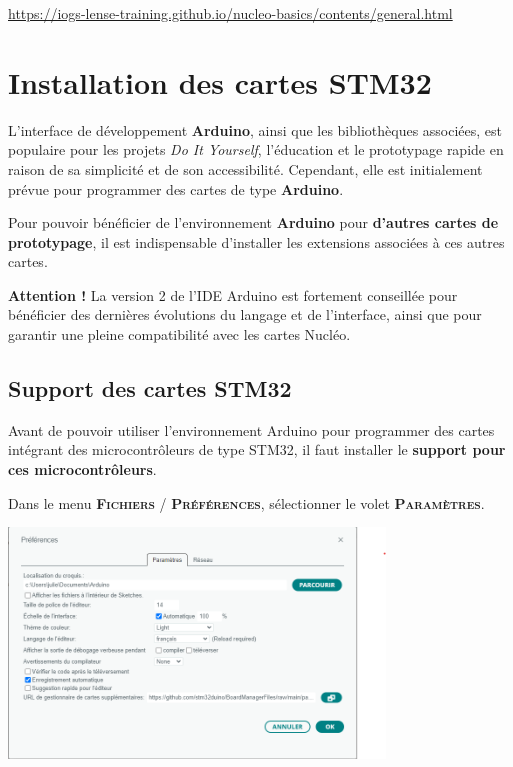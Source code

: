 \documentclass[a4paper,11pt,titlepage]{article} %
\begin{document}
\href{https://iogs-lense-training.github.io/nucleo-basics/contents/general.html}{https://iogs-lense-training.github.io/nucleo-basics/contents/general.html}

\cleardoublepage
\section{Installation des cartes STM32}

L'interface de développement \textbf{Arduino}, ainsi que les bibliothèques associées, est populaire pour les projets \textit{Do It Yourself}, l'éducation et le prototypage rapide en raison de sa simplicité et de son accessibilité. Cependant, elle est initialement prévue pour programmer des cartes de type \textbf{Arduino}.

Pour pouvoir bénéficier de l'environnement \textbf{Arduino} pour \textbf{d'autres cartes de prototypage}, il est indispensable d'installer les extensions associées à ces autres cartes.

\textbf{Attention !} La version 2 de l'IDE Arduino est fortement conseillée pour bénéficier des dernières évolutions du langage et de l'interface, ainsi que pour garantir une pleine compatibilité avec les cartes Nucléo.

\subsection{Support des cartes STM32}

Avant de pouvoir utiliser l'environnement Arduino pour programmer des cartes intégrant des microcontrôleurs de type STM32, il faut installer le \textbf{support pour ces microcontrôleurs}.

Dans le menu \textsc{\textbf{Fichiers} / \textbf{Préférences}}, sélectionner le volet \textsc{\textbf{Paramètres}}.

\begin{center}
	\includegraphics[width=0.75\textwidth]{images/arduino_preferences.png}
\end{center}
\end{document}
